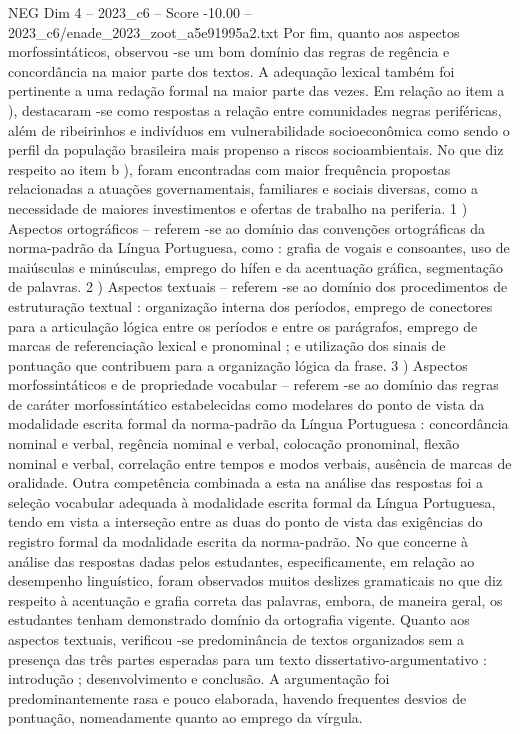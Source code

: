 \begin{textsample}{NEG Dim 4 – 2023\_c6 – Score -10.00 – 2023\_c6/enade\_2023\_zoot\_a5e91995a2.txt}
Por fim, quanto aos aspectos morfossintáticos, observou -se um bom domínio das regras de regência e concordância na maior parte dos textos.
A adequação lexical também foi pertinente a uma redação formal na maior parte das vezes.
Em relação ao item a ), destacaram -se como respostas a relação entre comunidades negras periféricas, além de ribeirinhos e indivíduos em vulnerabilidade socioeconômica como sendo o perfil da população brasileira mais propenso a riscos socioambientais.
No que diz respeito ao item b ), foram encontradas com maior frequência propostas relacionadas a atuações governamentais, familiares e sociais diversas, como a necessidade de maiores investimentos e ofertas de trabalho na periferia. 1 ) Aspectos ortográficos – referem -se ao domínio das convenções ortográficas da norma-padrão da Língua Portuguesa, como : grafia de vogais e consoantes, uso de maiúsculas e minúsculas, emprego do hífen e da acentuação gráfica, segmentação de palavras. 2 ) Aspectos textuais – referem -se ao domínio dos procedimentos de estruturação textual : organização interna dos períodos, emprego de conectores para a articulação lógica entre os períodos e entre os parágrafos, emprego de marcas de referenciação lexical e pronominal ; e utilização dos sinais de pontuação que contribuem para a organização lógica da frase. 3 ) Aspectos morfossintáticos e de propriedade vocabular – referem -se ao domínio das regras de caráter morfossintático estabelecidas como modelares do ponto de vista da modalidade escrita formal da norma-padrão da Língua Portuguesa : concordância nominal e verbal, regência nominal e verbal, colocação pronominal, flexão nominal e verbal, correlação entre tempos e modos verbais, ausência de marcas de oralidade.
Outra competência combinada a esta na análise das respostas foi a seleção vocabular adequada à modalidade escrita formal da Língua Portuguesa, tendo em vista a interseção entre as duas do ponto de vista das exigências do registro formal da modalidade escrita da norma-padrão.
No que concerne à análise das respostas dadas pelos estudantes, especificamente, em relação ao desempenho linguístico, foram observados muitos deslizes gramaticais no que diz respeito à acentuação e grafia correta das palavras, embora, de maneira geral, os estudantes tenham demonstrado domínio da ortografia vigente.
Quanto aos aspectos textuais, verificou -se predominância de textos organizados sem a presença das três partes esperadas para um texto dissertativo-argumentativo : introdução ; desenvolvimento e conclusão.
A argumentação foi predominantemente rasa e pouco elaborada, havendo frequentes desvios de pontuação, nomeadamente quanto ao emprego da vírgula.

\end{textsample}
